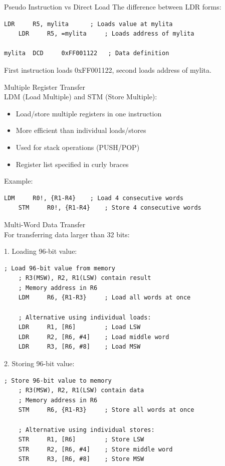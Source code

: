 \begin{example2}{Pseudo Instruction vs Direct Load}
The difference between LDR forms:
\begin{lstlisting}[language=armasm, style=base]
    LDR     R5, mylita      ; Loads value at mylita
    LDR     R5, =mylita     ; Loads address of mylita

mylita  DCD     0xFF001122   ; Data definition
\end{lstlisting}

First instruction loads 0xFF001122, second loads address of mylita.
\end{example2}

\begin{definition}{Multiple Register Transfer}\\
LDM (Load Multiple) and STM (Store Multiple):
\begin{itemize}
  \item Load/store multiple registers in one instruction
  \item More efficient than individual loads/stores
  \item Used for stack operations (PUSH/POP)
  \item Register list specified in curly braces
\end{itemize}

Example:
\begin{lstlisting}[language=armasm, style=base]
    LDM     R0!, {R1-R4}    ; Load 4 consecutive words
    STM     R0!, {R1-R4}    ; Store 4 consecutive words
\end{lstlisting}
\end{definition}

\begin{KR}{Multi-Word Data Transfer}\\
For transferring data larger than 32 bits:

1. Loading 96-bit value:
\begin{lstlisting}[language=armasm, style=base]
    ; Load 96-bit value from memory
    ; R3(MSW), R2, R1(LSW) contain result
    ; Memory address in R6
    LDM     R6, {R1-R3}     ; Load all words at once
    
    ; Alternative using individual loads:
    LDR     R1, [R6]        ; Load LSW
    LDR     R2, [R6, #4]    ; Load middle word
    LDR     R3, [R6, #8]    ; Load MSW
\end{lstlisting}

2. Storing 96-bit value:
\begin{lstlisting}[language=armasm, style=base]
    ; Store 96-bit value to memory
    ; R3(MSW), R2, R1(LSW) contain data
    ; Memory address in R6
    STM     R6, {R1-R3}     ; Store all words at once
    
    ; Alternative using individual stores:
    STR     R1, [R6]        ; Store LSW
    STR     R2, [R6, #4]    ; Store middle word
    STR     R3, [R6, #8]    ; Store MSW
\end{lstlisting}
\end{KR}


